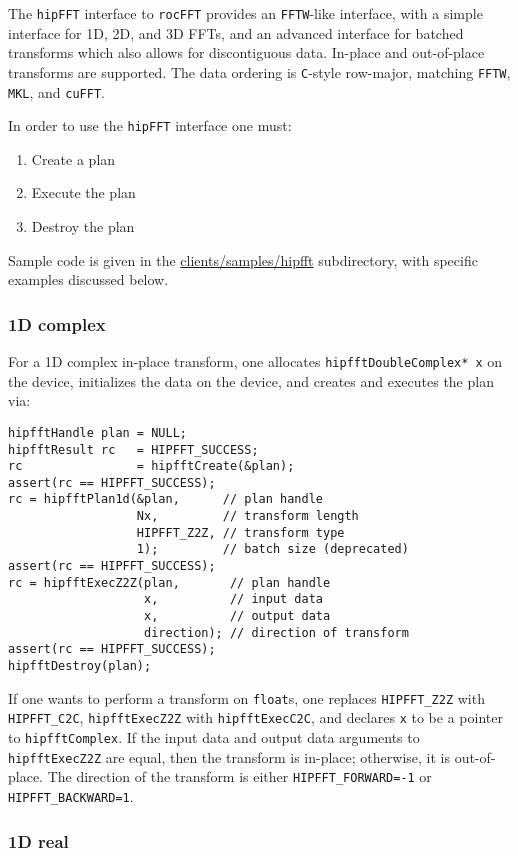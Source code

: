 \documentclass[10pt]{article}
\renewcommand{\(}{\left(}
\renewcommand{\)}{\right)}
\begin{document}
The \texttt{hipFFT} interface to \texttt{rocFFT} provides an
\texttt{FFTW}-like interface, with a simple interface for 1D, 2D, and
3D FFTs, and an advanced interface for batched transforms which also
allows for discontiguous data.  In-place and out-of-place transforms
are supported.  The data ordering is \texttt{C}-style row-major, matching
\texttt{FFTW}, \texttt{MKL}, and \texttt{cuFFT}.

In order to use the \texttt{hipFFT} interface one must:
\begin{enumerate}
\item Create a plan
\item Execute the plan
\item Destroy the plan
\end{enumerate}
Sample code is given in the \url{clients/samples/hipfft} subdirectory,
with specific examples discussed below.

\subsubsection{1D complex}
For a 1D complex in-place transform, one allocates
\lstinline{hipfftDoubleComplex* x} on the device, initializes the data
on the device, and creates and executes the plan via:
\begin{lstlisting}
hipfftHandle plan = NULL;
hipfftResult rc   = HIPFFT_SUCCESS;
rc                = hipfftCreate(&plan);
assert(rc == HIPFFT_SUCCESS);
rc = hipfftPlan1d(&plan,      // plan handle
                  Nx,         // transform length
                  HIPFFT_Z2Z, // transform type 
                  1);         // batch size (deprecated)
assert(rc == HIPFFT_SUCCESS);
rc = hipfftExecZ2Z(plan,       // plan handle
                   x,          // input data
                   x,          // output data
                   direction); // direction of transform
assert(rc == HIPFFT_SUCCESS);
hipfftDestroy(plan);
\end{lstlisting}
If one wants to perform a transform on \lstinline{float}s, one
replaces \lstinline{HIPFFT_Z2Z} with \lstinline{HIPFFT_C2C},
\lstinline{hipfftExecZ2Z} with \lstinline{hipfftExecC2C}, and declares
\lstinline{x} to be a pointer to \lstinline{hipfftComplex}.  If the
input data and output data arguments to \lstinline{hipfftExecZ2Z} are
equal, then the transform is in-place; otherwise, it is out-of-place.
The direction of the transform is either \lstinline{HIPFFT_FORWARD=-1}
or \lstinline{HIPFFT_BACKWARD=1}.

\subsubsection{1D real}
\end{document}
